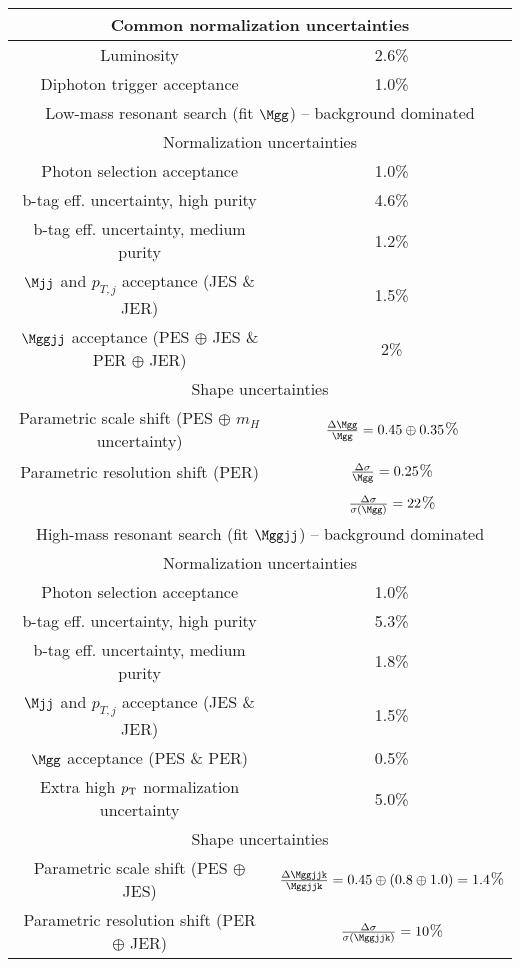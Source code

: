 \begin{tabular}{|c|c|}
\hline
\multicolumn{2}{|c|}{Common normalization uncertainties} \\
\hline
Luminosity & 2.6\%\\
Diphoton trigger acceptance & 1.0\% \\
\hline
\hline
\multicolumn{2}{|c|}{Low-mass resonant search (fit $\Mgg$) -- background dominated} \\
\hline
\hline
\multicolumn{2}{|c|}{Normalization uncertainties} \\
\hline
Photon selection acceptance & 1.0\% \\ 
b-tag eff. uncertainty, high purity & 4.6\% \\  
b-tag eff. uncertainty, medium purity & 1.2\% \\  
$\Mjj$ and $p_{T, j}$ acceptance (JES \& JER) & 1.5\%\\
$\Mggjj$ acceptance (PES $\oplus$ JES \& PER  $\oplus$ JER) & 2\%\\
\hline
\multicolumn{2}{|c|}{Shape uncertainties} \\
\hline
Parametric scale shift (PES $\oplus$ $m_H$ uncertainty)      & $\frac{\Delta\Mgg}{\Mgg} = 0.45 \oplus 0.35$\%\\
Parametric resolution shift (PER) & $\frac{\Delta\sigma}{\Mgg} = 0.25$\% \\
                                  & $\frac{\Delta\sigma}{\sigma(\Mgg)} = 22$\% \\
\hline
\hline
\multicolumn{2}{|c|}{High-mass resonant search (fit $\Mggjj$) -- background dominated} \\
\hline
\hline
\multicolumn{2}{|c|}{Normalization uncertainties} \\
\hline
Photon selection acceptance & 1.0\% \\ 
b-tag eff. uncertainty, high purity & 5.3\% \\  
b-tag eff. uncertainty, medium purity & 1.8\% \\  
$\Mjj$ and $p_{T, j}$ acceptance (JES \& JER) & 1.5\%\\
$\Mgg$ acceptance (PES \& PER) & 0.5\% \\
Extra high $p_{\rm T}$ normalization uncertainty & 5.0\% \\
\hline
\multicolumn{2}{|c|}{Shape uncertainties} \\
\hline
Parametric scale shift (PES $\oplus$ JES) & $\frac{\Delta\Mggjjk}{\Mggjjk} = 0.45 \oplus (0.8 \oplus 1.0) = 1.4$\% \\
Parametric resolution shift (PER $\oplus$ JER) & $\frac{\Delta\sigma}{\sigma(\Mggjjk)} = 10$\% \\
\hline
\end{tabular}
